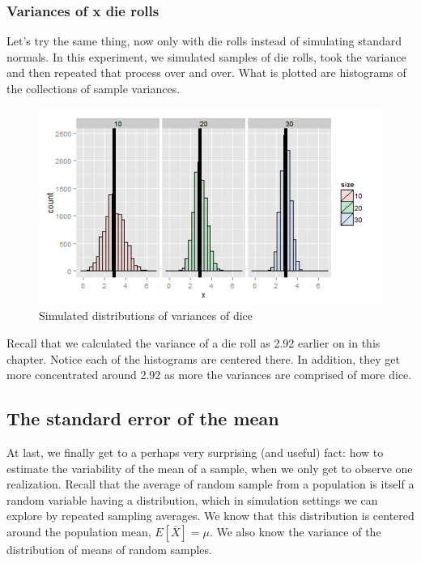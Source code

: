 \documentclass[]{article}
\begin{document}
\subsubsection{Variances of x die rolls}\label{variances-of-x-die-rolls}

Let's try the same thing, now only with die rolls instead of simulating
standard normals. In this experiment, we simulated samples of die rolls,
took the variance and then repeated that process over and over. What is
plotted are histograms of the collections of sample variances.

\begin{figure}[htbp]
\centering
\includegraphics{LeanPub/images/dieVariances-1.png}
\caption{Simulated distributions of variances of dice}
\end{figure}

Recall that we calculated the variance of a die roll as 2.92 earlier on
in this chapter. Notice each of the histograms are centered there. In
addition, they get more concentrated around 2.92 as more the variances
are comprised of more dice.

\subsection{The standard error of the
mean}\label{the-standard-error-of-the-mean}

At last, we finally get to a perhaps very surprising (and useful) fact:
how to estimate the variability of the mean of a sample, when we only
get to observe one realization. Recall that the average of random sample
from a population is itself a random variable having a distribution,
which in simulation settings we can explore by repeated sampling
averages. We know that this distribution is centered around the
population mean, $E[\bar X] = \mu$. We also know the variance of the
distribution of means of random samples.
\end{document}
